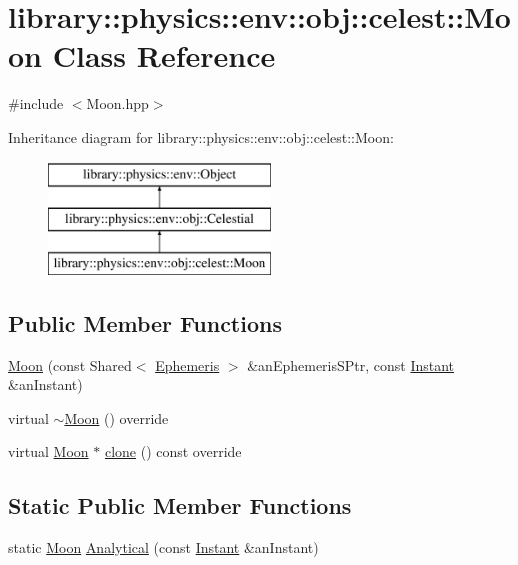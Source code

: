 \hypertarget{classlibrary_1_1physics_1_1env_1_1obj_1_1celest_1_1_moon}{}\section{library\+:\+:physics\+:\+:env\+:\+:obj\+:\+:celest\+:\+:Moon Class Reference}
\label{classlibrary_1_1physics_1_1env_1_1obj_1_1celest_1_1_moon}


{\ttfamily \#include $<$Moon.\+hpp$>$}

Inheritance diagram for library\+:\+:physics\+:\+:env\+:\+:obj\+:\+:celest\+:\+:Moon\+:\begin{figure}[H]
\begin{center}
\leavevmode
\includegraphics[height=3.000000cm]{classlibrary_1_1physics_1_1env_1_1obj_1_1celest_1_1_moon}
\end{center}
\end{figure}
\subsection*{Public Member Functions}
\begin{DoxyCompactItemize}
\item 
\hyperlink{classlibrary_1_1physics_1_1env_1_1obj_1_1celest_1_1_moon_aa7c19c2d391128ca7f4af52915b11261}{Moon} (const Shared$<$ \hyperlink{classlibrary_1_1physics_1_1env_1_1_ephemeris}{Ephemeris} $>$ \&an\+Ephemeris\+S\+Ptr, const \hyperlink{classlibrary_1_1physics_1_1time_1_1_instant}{Instant} \&an\+Instant)
\item 
virtual \hyperlink{classlibrary_1_1physics_1_1env_1_1obj_1_1celest_1_1_moon_aef4e99355b923e8c41ec12237bf41ecb}{$\sim$\+Moon} () override
\item 
virtual \hyperlink{classlibrary_1_1physics_1_1env_1_1obj_1_1celest_1_1_moon}{Moon} $\ast$ \hyperlink{classlibrary_1_1physics_1_1env_1_1obj_1_1celest_1_1_moon_a9d922ab338809a6c1052edbe11ce3e60}{clone} () const override
\end{DoxyCompactItemize}
\subsection*{Static Public Member Functions}
\begin{DoxyCompactItemize}
\item 
static \hyperlink{classlibrary_1_1physics_1_1env_1_1obj_1_1celest_1_1_moon}{Moon} \hyperlink{classlibrary_1_1physics_1_1env_1_1obj_1_1celest_1_1_moon_a3af7c97ead0a90e481705e74bef0d18d}{Analytical} (const \hyperlink{classlibrary_1_1physics_1_1time_1_1_instant}{Instant} \&an\+Instant)
\end{DoxyCompactItemize}
